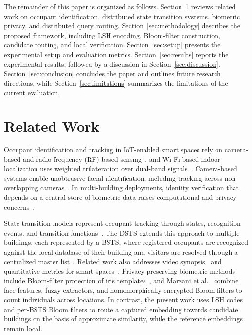 \documentclass[pdflatex,sn-mathphys-num]{sn-jnl}%
\theoremstyle{thmstyleone}%
\theoremstyle{thmstyletwo}%
\theoremstyle{thmstylethree}%
\begin{document}
The remainder of this paper is organized as follows. Section~\ref{sec:related} reviews related work on occupant identification, distributed state transition systems, biometric privacy, and distributed query routing. Section~\ref{sec:methodology} describes the proposed framework, including LSH encoding, Bloom-filter construction, candidate routing, and local verification. Section~\ref{sec:setup} presents the experimental setup and evaluation metrics. Section~\ref{sec:results} reports the experimental results, followed by a discussion in Section~\ref{sec:discussion}. Section~\ref{sec:conclusion} concludes the paper and outlines future research directions, while Section~\ref{sec:limitations} summarizes the limitations of the current evaluation.



\section{Related Work}
\label{sec:related}

Occupant identification and tracking in IoT-enabled smart spaces rely on camera-based and radio-frequency (RF)-based sensing~\cite{mohan2020,WZSYGWLLHSC2025}, and Wi-Fi-based indoor localization uses weighted trilateration over dual-band signals~\cite{MSSAB2019}. Camera-based systems enable unobtrusive facial identification, including tracking across non-overlapping cameras~\cite{nair2021}. In multi-building deployments, identity verification that depends on a central store of biometric data raises computational and privacy concerns~\cite{mohan2020}.

State transition models represent occupant tracking through states, recognition events, and transition functions~\cite{MJG2011}. The DSTS extends this approach to multiple buildings, each represented by a BSTS, where registered occupants are recognized against the local database of their building and visitors are resolved through a centralized master list~\cite{mohan2020}. Related work also addresses video synopsis~\cite{NGA2022} and quantitative metrics for smart spaces~\cite{MMJ2025}. Privacy-preserving biometric methods include Bloom-filter protection of iris templates~\cite{rathgeb2014}, and Marzani et al.~\cite{marzani2026} combine face features, fuzzy extractors, and homomorphically encrypted Bloom filters to count individuals across locations. In contrast, the present work uses LSH codes and per-BSTS Bloom filters to route a captured embedding towards candidate buildings on the basis of approximate similarity, while the reference embeddings remain local.
\end{document}
